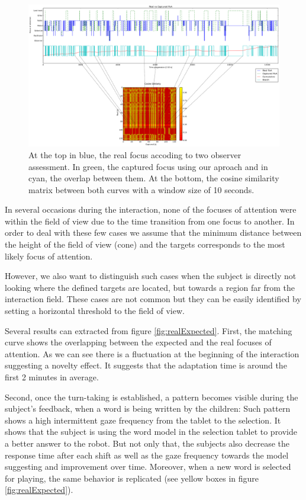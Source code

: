 \documentclass{sig-alternate}
\begin{document}
\begin{figure}
    \centering
    \includegraphics[width=2\columnwidth]{bitmap_zoom}
    \caption{\small At the top in blue, the real focus accoding to two observer assessment. In green, the captured focus using our aproach and in cyan, the overlap between them. At the bottom, the cosine similarity matrix between both curves with a window size of 10 seconds.}
    \label{fig:realCaptured}
\end{figure}


In several occasions during the interaction, none of the focuses of attention were within the field of view due to the time transition from one focus to another. In order to deal with these few cases we assume that the minimum distance between the height of the field of view (cone) and the targets corresponds to the most likely focus of attention.

However, we also want to distinguish such cases when the subject is directly not looking where the defined targets are located, but towards a region far from the interaction field. These cases are not common but they can be easily identified by setting a horizontal threshold to the field of view.

Several results can extracted from figure \ref{fig:realExpected}. First, the matching curve shows the overlapping between the expected and the real focuses of attention. As we can see there is a fluctuation at the beginning of the interaction suggesting a novelty effect. It suggests that the adaptation time is around the first 2 minutes in average. 

Second, once the turn-taking is established, a pattern becomes visible during the subject's feedback, when a word is being written by the children: Such pattern shows a high intermittent gaze frequency from the tablet to the selection. It shows that the subject is using the word model in the selection tablet to provide a better answer to the robot. But not only that, the subjects also decrease the response time after each shift as well as the gaze frequency towards the model suggesting and improvement over time. Moreover, when a new word is selected for playing, the same behavior is replicated (see yellow boxes in figure \ref{fig:realExpected}).
\end{document}
